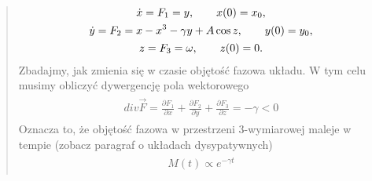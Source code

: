 \documentclass[a4paper,12pt,polish]{sphinxmanual}
\begin{document}
\begin{quote}
\label{ch2/chII012:equation-eqn11}\begin{gather}
\begin{split}\dot x = F_1 = y , \qquad x(0) = x_0,\end{split}\label{ch2/chII012-eqn11}\\\begin{split}\dot y = F_2 = x - x^3 -\gamma y + A \cos z , \qquad y(0) = y_0,\end{split}\notag\\\begin{split}z = F_3 = \omega, \qquad z(0) = 0.\end{split}\notag
\end{gather}
Zbadajmy, jak zmienia się w czasie objętość fazowa układu.  W tym celu musimy obliczyć dywergencję pola wektorowego
\label{ch2/chII012:equation-eqn12}\begin{gather}
\begin{split} div  \vec F = \frac{\partial F_1}{\partial x} + \frac{\partial F_2}{\partial y} + \frac{\partial F_3}{\partial z}  = -\gamma < 0\end{split}\label{ch2/chII012-eqn12}
\end{gather}
Oznacza to, że objętość fazowa w przestrzeni 3-wymiarowej maleje w tempie (zobacz paragraf o układach dysypatywnych)
\label{ch2/chII012:equation-eqn13}\begin{gather}
\begin{split}M(t) \propto e^{-\gamma t}\end{split}\label{ch2/chII012-eqn13}
\end{gather}\end{quote}
\end{document}
